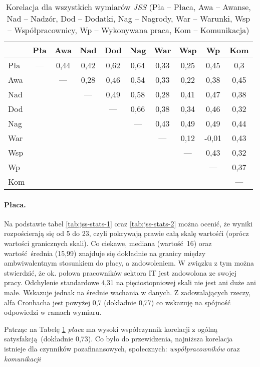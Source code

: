 \begin{table}[h!]
\begin{center}
\begin{tabular} { l | c c c c c c c c c }
 & Pła & Awa & Nad & Dod & Nag & War & Wsp & Wp & Kom \\ \hline \hline
Pła & --- & 0,44 & 0,42 & 0,62 & 0,64 & 0,33 & 0,25 & 0,45 & 0,3 \\
Awa & & --- & 0,28 & 0,46 & 0,54 & 0,33 & 0,22 & 0,38 & 0,45 \\
Nad & & & --- & 0,49 & 0,58 & 0,28 & 0,41 & 0,47 & 0,38 \\
Dod & & & & --- & 0,66 & 0,38 & 0,34 & 0,46 & 0,32 \\
Nag & & & & & --- & 0,43 & 0,49 & 0,49 & 0,44 \\
War & & & & & & --- & 0,12 & -0,01 & 0,43 \\
Wsp & & & & & & & --- & 0,43 & 0,32 \\
Wp & & & & & & & & --- & 0,37 \\
Kom & & & & & & & & & ---  \\
\end{tabular}
\end{center}
\caption[Korelacja dla wszystkich wymiarów \emph{JSS}]{Korelacja dla wszystkich wymiarów \emph{JSS} (Pła -- Płaca, Awa -- Awanse, Nad -- Nadzór, Dod -- Dodatki, Nag -- Nagrody, War -- Warunki, Wsp -- Współpracownicy, Wp -- Wykonywana praca, Kom -- Komunikacja)}
\label{tab:jss-correl}
\end{table}

\paragraph{Płaca.} Na podstawie tabel \ref{tab:jss-stats-1} oraz \ref{tab:jss-stats-2} można ocenić, że wyniki rozpościerają się od 5 do 23, czyli pokrywają prawie całą skalę wartośći (oprócz wartości granicznych skali). Co ciekawe, mediana (wartość 16) oraz wartość średnia (15,99) znajduje się dokładnie na granicy między ambwiwalentnym stosunkiem do płacy, a zadowoleniem. W związku z tym można stwierdzić, że ok. połowa pracowników sektora IT jest zadowolona ze swojej pracy. Odchylenie standardowe 4,31 na pięciostopniowej skali nie jest ani duże ani małe. Wskazuje
jednak na średnie wachania w danych. Z zadowalających rzeczy, alfa Cronbacha jest powyżej 0,7 (dokładnie 0,77) co wskazuję na spójność odpowiedzi w ramach wymiaru.

Patrząc na Tabelę \ref{tab:jss-correl} \textit{płaca} ma wysoki współczynnik korelacji z ogólną satysfakcją (dokładnie 0,73). Co było do przewidzenia, najniższa korelacja istnieje dla czynników pozafinansowych, społecznych: \emph{współpracowników} oraz \emph{komunikacji}

